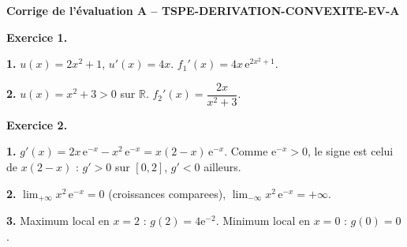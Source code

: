 %
%
%
%

\textbf{Corrige de l'évaluation A -- TSPE-DERIVATION-CONVEXITE-EV-A}

\textbf{Exercice 1.}

\textbf{1.} $u(x) = 2x^2 + 1$, $u'(x) = 4x$. $f_1'(x) = 4x\,\mathrm{e}^{2x^2+1}$.

\textbf{2.} $u(x) = x^2 + 3 > 0$ sur $\mathbb{R}$. $f_2'(x) = \dfrac{2x}{x^2 + 3}$.

\bigskip

\textbf{Exercice 2.}

\textbf{1.} $g'(x) = 2x\,\mathrm{e}^{-x} - x^2\,\mathrm{e}^{-x} = x(2-x)\,\mathrm{e}^{-x}$. Comme $\mathrm{e}^{-x} > 0$, le signe est celui de $x(2-x)$ : $g' > 0$ sur $[0, 2]$, $g' < 0$ ailleurs.

\textbf{2.} $\lim_{+\infty} x^2\,\mathrm{e}^{-x} = 0$ (croissances comparees), $\lim_{-\infty} x^2\,\mathrm{e}^{-x} = +\infty$.

\textbf{3.} Maximum local en $x = 2$ : $g(2) = 4\mathrm{e}^{-2}$. Minimum local en $x = 0$ : $g(0) = 0$.

\bigskip

